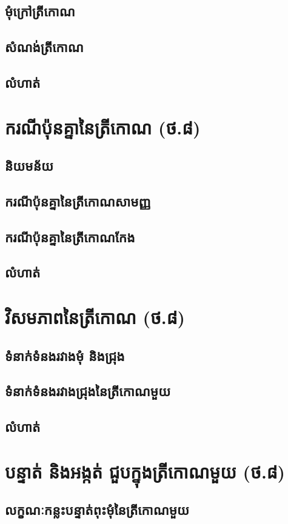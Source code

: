 \documentclass[a4paper,12pt,blue]{pptec}
\begin{document}
	\section{មុំក្រៅត្រីកោណ}
	\section{សំណង់ត្រីកោណ}
	\section{លំហាត់}
	\chapter{ករណីប៉ុនគ្នានៃត្រីកោណ (ថ.៨)}
	\section{និយមន័យ}
	\section{ករណីប៉ុនគ្នានៃត្រីកោណសាមញ្ញ}
	\section{ករណីប៉ុនគ្នានៃត្រីកោណកែង}
	\section{លំហាត់}
	\chapter{វិសមភាពនៃត្រីកោណ (ថ.៨)}
	\section{ទំនាក់ទំនងរវាងមុំ និងជ្រុង}
	\section{ទំនាក់ទំនងរវាងជ្រុងនៃត្រីកោណមួយ}
	\section{លំហាត់}
	\chapter{បន្ទាត់ និងអង្កត់ ជួបក្នុងត្រីកោណមួយ (ថ.៨)}
	\section{លក្ខណៈកន្លះបន្ទាត់ពុះមុំនៃត្រីកោណមួយ}
\end{document}
